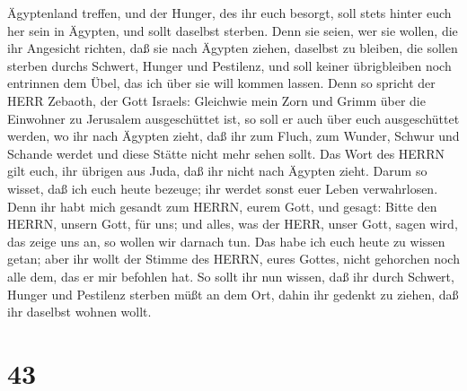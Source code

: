 Ägyptenland treffen, und der Hunger, des ihr euch besorgt, soll stets
hinter euch her sein in Ägypten, und sollt daselbst sterben.
 Denn sie seien, wer sie wollen, die ihr Angesicht richten,
daß sie nach Ägypten ziehen, daselbst zu bleiben, die sollen sterben
durchs Schwert, Hunger und Pestilenz, und soll keiner übrigbleiben noch
entrinnen dem Übel, das ich über sie will kommen lassen. 
Denn so spricht der HERR Zebaoth, der Gott Israels: Gleichwie mein Zorn
und Grimm über die Einwohner zu Jerusalem ausgeschüttet ist, so soll er
auch über euch ausgeschüttet werden, wo ihr nach Ägypten zieht, daß ihr
zum Fluch, zum Wunder, Schwur und Schande werdet und diese Stätte nicht
mehr sehen sollt.  Das Wort des HERRN gilt euch, ihr
übrigen aus Juda, daß ihr nicht nach Ägypten zieht. Darum so wisset, daß
ich euch heute bezeuge;  ihr werdet sonst euer Leben
verwahrlosen. Denn ihr habt mich gesandt zum HERRN, eurem Gott, und
gesagt: Bitte den HERRN, unsern Gott, für uns; und alles, was der HERR,
unser Gott, sagen wird, das zeige uns an, so wollen wir darnach tun.
 Das habe ich euch heute zu wissen getan; aber ihr wollt
der Stimme des HERRN, eures Gottes, nicht gehorchen noch alle dem, das
er mir befohlen hat.  So sollt ihr nun wissen, daß ihr
durch Schwert, Hunger und Pestilenz sterben müßt an dem Ort, dahin ihr
gedenkt zu ziehen, daß ihr daselbst wohnen wollt.

\hypertarget{section-42}{%
\section{43}\label{section-42}}

